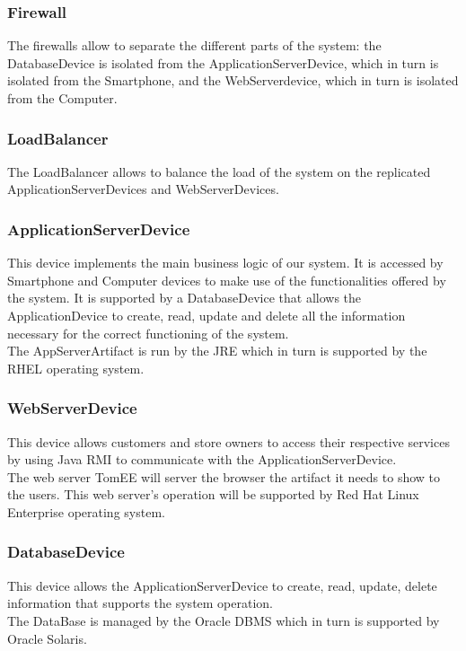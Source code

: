\subsubsection{Firewall}
The firewalls allow to separate the different parts of the system: the DatabaseDevice is isolated from the ApplicationServerDevice, which in turn is isolated from the Smartphone, and the WebServerdevice, which in turn is isolated from the Computer.
\subsubsection{LoadBalancer}
The LoadBalancer allows to balance the load of the system on the replicated ApplicationServerDevices and WebServerDevices.
\subsubsection{ApplicationServerDevice}
This device implements the main business logic of our system. It is accessed by Smartphone and Computer devices to make use of the functionalities offered by the system. It is supported by a DatabaseDevice that allows the ApplicationDevice to create, read, update and delete all the information necessary for the correct functioning of the system.\\
The AppServerArtifact is run by the JRE which in turn is supported by the RHEL operating system.
\subsubsection{WebServerDevice}
This device allows customers and store owners to access their respective services by using Java RMI to communicate with the ApplicationServerDevice.\\
The web server TomEE will server the browser the artifact it needs to show to the users. This web server's operation will be supported by Red Hat Linux Enterprise operating system.
\subsubsection{DatabaseDevice}
This device allows the ApplicationServerDevice to create, read, update, delete information that supports the system operation.\\
The DataBase is managed by the Oracle DBMS which in turn is supported by Oracle Solaris.\newpage

